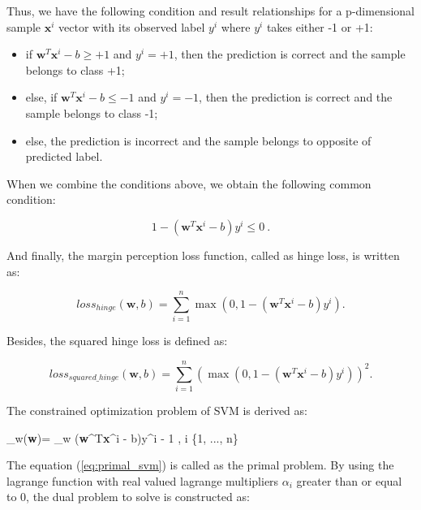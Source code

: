Thus, we have the following condition and result relationships for a p-dimensional sample $\textbf{x}^{i}$ vector with its observed label $y^{i}$ where $y^{i}$ takes either -1 or +1:

\begin{itemize}
	\item if $\textbf{w}^{T}\textbf{x}^{i} - b \geq +1$ and $y^{i} = +1$, then the prediction is correct and the sample belongs to class +1;
	\item else, if $\textbf{w}^{T}\textbf{x}^{i} - b \leq -1$ and $y^{i} = -1$, then the prediction is correct and the sample belongs to class -1;
	\item else, the prediction is incorrect and the sample belongs to opposite of predicted label.
\end{itemize}

When we combine the conditions above, we obtain the following common condition:

\begin{equation}
	\label{common_loss} 
	1 - (\textbf{w}^{T}\textbf{x}^{i} - b)y^{i} \leq 0\:.
\end{equation}

And finally, the margin perception loss function, called as hinge loss, is written as:

\begin{equation}
	\label{hinge_loss} 
	loss_{hinge}(\textbf{w}, b) = \sum_{i=1}^{n} \max(0, 1 - (\textbf{w}^{T}\textbf{x}^{i} - b)y^{i}).
\end{equation}

Besides, the squared hinge loss is defined as:

\begin{equation}
	\label{squared_hinge_loss} 
	loss_{squared\_hinge}(\textbf{w}, b) = \sum_{i=1}^{n} (\max(0, 1 - (\textbf{w}^{T}\textbf{x}^{i} - b)y^{i}))^{2}.
\end{equation}

The constrained optimization problem of SVM is derived as:

\be
\label{eq:primal_svm}
\min_{w}\ell(\textbf{w})= \min_{w}  \quad {} \:\:
(\textbf{w}^{T}\textbf{x}^{i} - b)y^{i} - 1  \:, \quad \forall i \in \{1, ..., n\}
\ee

The equation (\ref{eq:primal_svm}) is called as the primal problem. By using the lagrange function with real valued lagrange multipliers $\alpha_{i}$ greater than or equal to 0, the dual problem to solve is constructed as:

